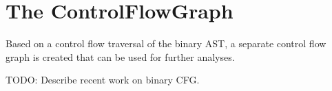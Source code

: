










\section{The ControlFlowGraph}

Based on a control flow traversal of the binary AST, a separate control flow graph
is created that can be used for further analyses.

TODO: Describe recent work on binary CFG.


